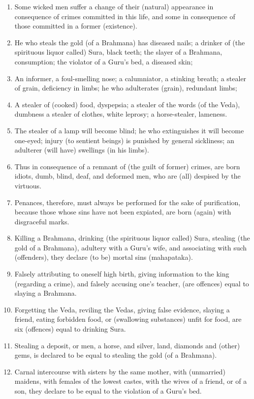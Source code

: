 \begin{enumerate}
\item Some wicked men suffer a change of their (natural) appearance in consequence of crimes committed in this life, and some in consequence of those committed in a former (existence).
\item He who steals the gold (of a Brahmana) has diseased nails; a drinker of (the spirituous liquor called) Sura, black teeth; the slayer of a Brahmana, consumption; the violator of a Guru's bed, a diseased skin;
\item An informer, a foul-smelling nose; a calumniator, a stinking breath; a stealer of grain, deficiency in limbs; he who adulterates (grain), redundant limbs;
\item A stealer of (cooked) food, dyspepsia; a stealer of the words (of the Veda), dumbness a stealer of clothes, white leprosy; a horse-stealer, lameness.
\item The stealer of a lamp will become blind; he who extinguishes it will become one-eyed; injury (to sentient beings) is punished by general sickliness; an adulterer (will have) swellings (in his limbs).
\item Thus in consequence of a remnant of (the guilt of former) crimes, are born idiots, dumb, blind, deaf, and deformed men, who are (all) despised by the virtuous.
\item Penances, therefore, must always be performed for the sake of purification, because those whose sins have not been expiated, are born (again) with disgraceful marks.
\item Killing a Brahmana, drinking (the spirituous liquor called) Sura, stealing (the gold of a Brahmana), adultery with a Guru's wife, and associating with such (offenders), they declare (to be) mortal sins (mahapataka).
\item Falsely attributing to oneself high birth, giving information to the king (regarding a crime), and falsely accusing one's teacher, (are offences) equal to slaying a Brahmana.
\item Forgetting the Veda, reviling the Vedas, giving false evidence, slaying a friend, eating forbidden food, or (swallowing substances) unfit for food, are six (offences) equal to drinking Sura.
\item Stealing a deposit, or men, a horse, and silver, land, diamonds and (other) gems, is declared to be equal to stealing the gold (of a Brahmana).
\item Carnal intercourse with sisters by the same mother, with (unmarried) maidens, with females of the lowest castes, with the wives of a friend, or of a son, they declare to be equal to the violation of a Guru's bed.

\end{enumerate}
